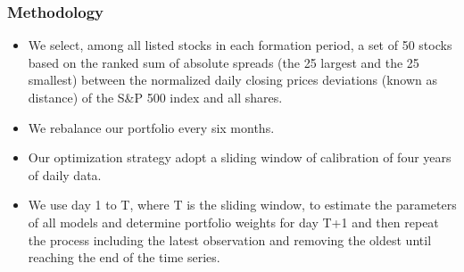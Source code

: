\documentclass[pdf,9pt,xcolor=dvipsnames,hide notes]{beamer}
\begin{document}
\begin{frame}[label=frame4h]
	\frametitle{Methodology}
	
	\begin{itemize}
		\justifying
		
		
		\vspace{0.3cm}
		
		\item We select, among all listed stocks in	each formation period, a set of 50 stocks based on the ranked sum of absolute spreads (the 25 largest and the 25 smallest) between the normalized
		daily closing prices deviations (known as distance) of the
		S\&P 500 index and all shares.
		
%		
		
		\vspace{0.3cm}
		
		\item We rebalance our portfolio every six months.
		
		\vspace{0.3cm}
		
		\item Our optimization strategy adopt a sliding window of calibration of four years of daily data.
		
		\vspace{0.3cm}
		
		\item We use day 1 to T, where T is the sliding window, to
		estimate the parameters of all models and determine portfolio weights for
		day T+1 and then repeat the process including the latest observation and
		removing the oldest until reaching the end of the time series. 
%		
%		
%		
		
		\end{itemize}
	
\end{frame}
\end{document}
